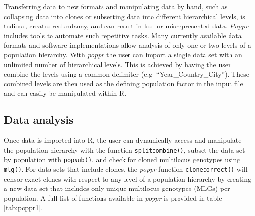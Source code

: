 \documentclass[double,11pt]{beavtex}
\begin{document}
  Transferring data to new formats and manipulating data by hand, such as
  collapsing data into clones or subsetting data into different
  hierarchical levels, is tedious, creates redundancy, and can result in
  lost or misrepresented data. \emph{Poppr} includes tools to automate
  such repetitive tasks. Many currently available data formats and
  software implementations allow analysis of only one or two levels of a
  population hierarchy. With \emph{poppr} the user can import a single
  data set with an unlimited number of hierarchical levels. This is
  achieved by having the user combine the levels using a common delimiter
  (e.g. ``Year\_Country\_City''). These combined levels are then used as
  the defining population factor in the input file and can easily be
  manipulated within R.
  
  \subsection{Data analysis}\label{data-analysis}
  
  Once data is imported into R, the user can dynamically access and
  manipulate the population hierarchy with the function
  \texttt{splitcombine()}, subset the data set by population with
  \texttt{popsub()}, and check for cloned multilocus genotypes using
  \texttt{mlg()}. For data sets that include clones, the \emph{poppr}
  function \texttt{clonecorrect()} will censor exact clones with respect
  to any level of a population hierarchy by creating a new data set that
  includes only unique multilocus genotypes (MLGs) per population. A full
  list of functions available in \emph{poppr} is provided in table
  \ref{tab:poppr1}.
  
\end{document}

